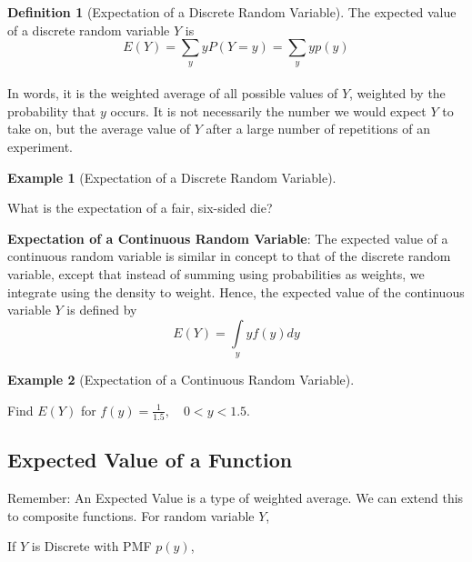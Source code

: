 \documentclass[
]{book}
\theoremstyle{definition}
\newtheorem{definition}{Definition}[chapter]
\theoremstyle{definition}
\newtheorem{example}{Example}[chapter]
\theoremstyle{definition}
\theoremstyle{definition}
\theoremstyle{remark}
\begin{document}
\begin{definition}[Expectation of a Discrete Random Variable]
\protect\hypertarget{def:unnamed-chunk-270}{}{\label{def:unnamed-chunk-270} {} }The expected value of a discrete random variable \(Y\) is \[E(Y)=\sum\limits_{y} y P(Y=y)= \sum\limits_{y} y p(y)\]\\
In words, it is the weighted average of all possible values of \(Y\), weighted by the probability that \(y\) occurs. It is not necessarily the number we would expect \(Y\) to take on, but the average value of \(Y\) after a large number of repetitions of an experiment.
\end{definition}

\begin{example}[Expectation of a Discrete Random Variable]
\protect\hypertarget{exm:expectdiscrete}{}{\label{exm:expectdiscrete} {} }

What is the expectation of a fair, six-sided die?
\end{example}

\textbf{Expectation of a Continuous Random Variable}: The expected
value of a continuous random variable is similar in concept to that of
the discrete random variable, except that instead of summing using
probabilities as weights, we integrate using the density to weight.
Hence, the expected value of the continuous variable \(Y\) is defined by
\[E(Y)=\int\limits_{y} y f(y) dy\]

\begin{example}[Expectation of a Continuous Random Variable]
\protect\hypertarget{exm:expectconti}{}{\label{exm:expectconti} {} }

Find \(E(Y)\) for \(f(y)=\frac{1}{1.5}, \quad 0<y<1.5\).
\end{example}

\hypertarget{expected-value-of-a-function}{%
\subsection*{Expected Value of a Function}\label{expected-value-of-a-function}}

Remember: An Expected Value is a type of weighted average. We can extend this to composite functions. For random variable \(Y\),

If \(Y\) is Discrete with PMF \(p(y)\),
\end{document}

